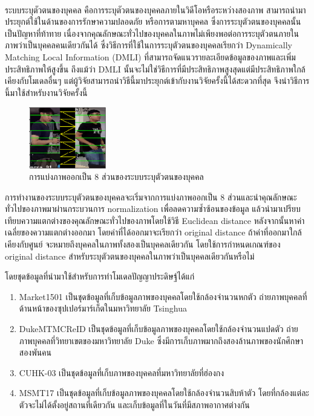 ระบบระบุตัวตนของบุคคล\textsuperscript{\cite{luo2019alignedreid++}}\textsuperscript{\cite{zhang2017alignedreid}} คือการระบุตัวตนของบุคคลภายในวิดีโอหรือระหว่างสองภาพ สามารถนำมาประยุกต์ใช้ในด้านของการรักษาความปลอดภัย 
หรือการตามหาบุคคล ซึ่งการระบุตัวตนของบุคคลนั้นเป็นปัญหาที่ท้าทาย เนื่องจากคุณลักษณะทั่วไปของบุคคลในภาพไม่เพียงพอต่อการระบุตัวตนภายในภาพว่าเป็นบุคคลคนเดียวกันได้ ซึ่งวิธีการที่ใช้ในการระบุตัวตนของบุคคลเรียกว่า 
Dynamically Matching Local Information (DMLI) ที่สามารถจัดแนวรายละเอียดข้อมูลของภาพและเพิ่มประสิทธิภาพให้สูงขึ้น 
ถึงแม้ว่า DMLI นั้นจะไม่ใช่วิธีการที่มีประสิทธิภาพสูงสุดแต่มีประสิทธิภาพใกล้เคียงกับโมเดลอื่นๆ แต่ผู้วิจัยสามารถนำวิธีนี้มาประยุกต์เข้ากับงานวิจัยครั้งนี้ได้สะดวกที่สุด จึงนำวิธีการนี้มาใช้สำหรับงานวิจัยครั้งนี้

\begin{figure}[!ht]
	\centering
	\includegraphics[width=0.3\textwidth]{chapter2/images/alignedreid.png}
		\caption{การแบ่งภาพออกเป็น 8 ส่วนของระบบระบุตัวตนของบุคคล}
    	\label{fig:alignedreid}
\end{figure}

การทำงานของระบบระบุตัวตนของบุคคลจะเริ่มจากการแบ่งภาพออกเป็น 8 ส่วนและนำคุณลักษณะทั่วไปของภาพมาผ่านกระบวนการ normalization เพื่อลดความซ้ำซ้อนของข้อมูล 
แล้วนำมาเปรียบเทียบความแตกต่างของคุณลักษณะทั่วไปของภาพโดยใช้วิธี Euclidean distance หลังจากนั้นหาค่าเฉลี่ยของความแตกต่างออกมา โดยค่าที่ได้ออกมาจะเรียกว่า original distance ถ้าค่าที่ออกมาใกล้เคียงกับศูนย์
จะหมายถึงบุคคลในภาพทั้งสองเป็นบุคคลเดียวกัน โดยใช้การกำหนดเกณฑ์ของ original distance สำหรับระบุตัวตนของบุคคลในภาพว่าเป็นบุคคลเดียวกันหรือไม่

โดยชุดข้อมูลที่นำมาใช้สำหรับการทำโมเดลปัญญาประดิษฐ์ได้แก่
\begin{enumerate}
	\item{Market1501 เป็นชุดข้อมูลที่เก็บข้อมูลภาพของบุคคลโดยใช้กล้องจำนวนหกตัว ถ่ายภาพบุคคลที่ด้านหน้าของซุปเปอร์มาร์เก็ตในมหาวิทยาลัย Tsinghua}
	\item{DukeMTMCReID เป็นชุดข้อมูลที่เก็บข้อมูลภาพของบุคคลโดยใช้กล้องจำนวนแปดตัว ถ่ายภาพบุคคลที่วิทยาเขตของมหาวิทยาลัย Duke ซึ่งมีการเก็บภาพมากถึงสองล้านภาพของนักศึกษาสองพันคน }
	\item{CUHK-03 เป็นชุดข้อมูลที่เก็บภาพของบุคคลที่มหาวิทยาลัยที่ฮ่องกง}
	\item{MSMT17 เป็นชุดข้อมูลที่เก็บข้อมูลภาพของบุคคลโดยใช้กล้องจำนวนสิบห้าตัว โดยที่กล้องแต่ละตัวจะไม่ได้ตั้งอยู่สถานที่เดียวกัน และเก็บข้อมูลที่ในวันที่มีสภาพอากาศต่างกัน}
\end{enumerate}

